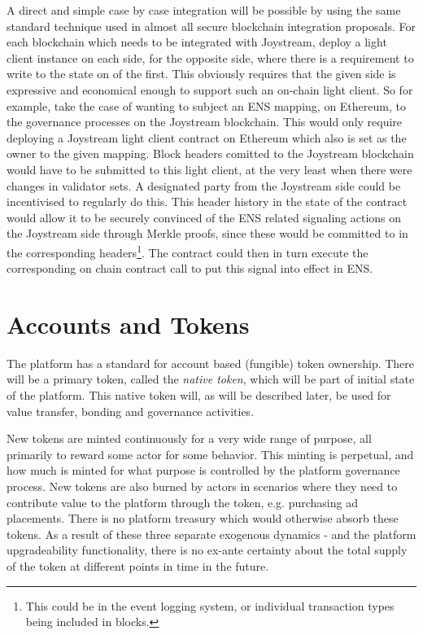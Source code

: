 \documentclass{article}
\begin{document}
A direct and simple case by case integration will be possible by using the same standard technique used in almost all secure blockchain integration proposals. For each blockchain which needs to be integrated with Joystream, deploy a light client instance on each side, for the opposite side, where there is a requirement to write to the state on of the first. This obviously requires that the given side is expressive and economical enough to support such an on-chain light client. So for example, take the case of wanting to subject an ENS mapping, on Ethereum, to the governance processes on the Joystream blockchain. This would only require deploying a Joystream light client contract on Ethereum which also is set as the owner to the given mapping. Block headers comitted to the Joystream blockchain would have to be submitted to this light client, at the very least when there were changes in validator sets. A designated party from the Joystream side could be incentivised to regularly do this. This header history in the state of the contract would allow it to be securely convinced of the ENS related signaling actions on the Joystream side through Merkle proofs, since these would be committed to in the corresponding headers\footnote{This could be in the event logging system, or individual transaction types being included in blocks.}. The contract could then in turn execute the corresponding on chain contract call to put this signal into effect in ENS.


\section{Accounts and Tokens} \label{sec:accounts_and_tokens}

The platform has a standard for account based (fungible) token ownership. There will be a primary token, called the \textit{native token}, which will be part of initial state of the platform. This native token will, as will be described later, be used for value transfer, bonding and governance activities.

New tokens are minted continuously for a very wide range of purpose, all primarily to reward some actor for some behavior. This minting is perpetual, and how much is minted for what purpose is controlled by the platform governance process. New tokens are also burned by actors in scenarios where they need to contribute value to the platform through the token, e.g. purchasing ad placements. There is no platform treasury which would otherwise absorb these tokens. As a result of these three separate exogenous dynamics - and the platform upgradeability functionality, there is no ex-ante certainty about the total supply of the token at different points in time in the future.
\end{document}
